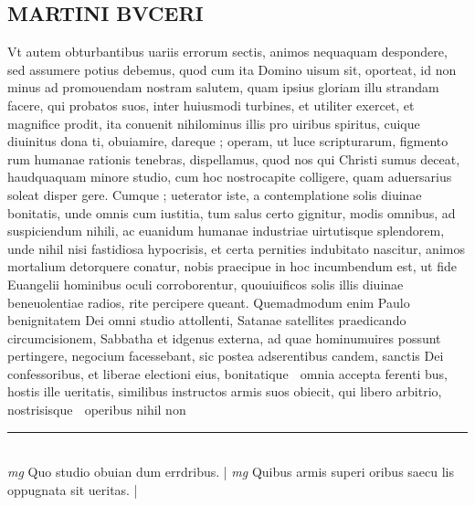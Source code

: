 \documentclass{article}
\begin{document}
\begin{pages}
\section*{MARTINI BVCERI }\pstart Vt autem obturbantibus   uariis errorum sectis, animos nequaquam despondere, sed assumere potius debemus, quod cum ita Domino uisum sit, oporteat, id non minus ad promouendam nostram salutem, quam ipsius gloriam illu strandam facere, qui probatos suos, inter huiusmodi turbines, et utiliter exercet, et magnifice prodit, ita conuenit nihilominus illis pro uiribus spiritus, cuique  diuinitus dona ti, obuiamire, dareque ; operam, ut luce scripturarum, figmento rum humanae rationis tenebras, dispellamus, quod nos qui Christi sumus deceat, haudquaquam minore studio, cum hoc nostrocapite colligere, quam aduersarius soleat disper gere. Cumque ; ueterator iste, a contemplatione solis diuinae bonitatis, unde omnis cum iustitia, tum salus certo gignitur, modis omnibus, ad suspiciendum nihili, ac euanidum humanae industriae uirtutisque  splendorem, unde nihil nisi fastidiosa hypocrisis, et certa pernities indubitato nascitur, animos mortalium detorquere conatur, nobis praecipue in hoc incumbendum est, ut fide Euangelii hominibus oculi corroborentur, quouiuificos solis illis diuinae beneuolentiae radios, rite percipere queant.   \pend\pstart Quemadmodum enim Paulo benignitatem Dei omni studio attollenti, Satanae satellites praedicando circumcisionem, Sabbatha et idgenus externa, ad quae hominumuires possunt pertingere, negocium facessebant, sic postea adserentibus candem, sanctis Dei confessoribus, et liberae electioni eius, bonitatique  omnia accepta ferenti bus, hostis ille ueritatis, similibus instructos armis suos obiecit, qui libero arbitrio, nostrisisque  operibus nihil non  \pend
\vspace{0.5cm}\noindent
\vspace{0.2cm}\rule{1cm}{0.2pt}\\ 
\hspace{0.2cm}\textit{mg}
\footnotesize Quo studio obuian dum errdribus.  
\normalsize| 
\hspace{0.2cm}\textit{mg}
\footnotesize Quibus  armis superi oribus   saecu lis oppugnata sit ueritas.  
\normalsize| 

\end{pages}
\end{document}
